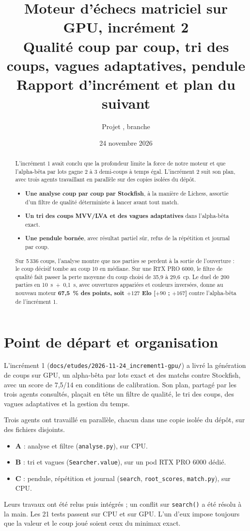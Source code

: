 \documentclass[11pt,a4paper]{article}
\title{Moteur d'échecs matriciel sur GPU, incrément 2\\[2pt]
\large Qualité coup par coup, tri des coups, vagues adaptatives, pendule\\
\normalsize Rapport d'incrément et plan du suivant}
\author{Projet \code{chess-gpu}, branche \code{claude/zen-pasteur-vjg9yx}}
\date{24 novembre 2026}
\newcommand{\code}[1]{\texttt{#1}}
\begin{document}
\maketitle

\begin{abstract}
L'incrément 1 avait conclu que la profondeur limite la force de notre moteur et que l'alpha-bêta
par lots gagne 2 à 3 demi-coups à temps égal. L'incrément 2 suit son plan, avec trois agents
travaillant en parallèle sur des copies isolées du dépôt.
\begin{itemize}
\item \textbf{Une analyse coup par coup par Stockfish}, à la manière de Lichess, assortie d'un
filtre de qualité déterministe à lancer avant tout match.
\item \textbf{Un tri des coups MVV/LVA et des vagues adaptatives} dans l'alpha-bêta exact.
\item \textbf{Une pendule bornée}, avec résultat partiel sûr, refus de la répétition et journal par
coup.
\end{itemize}
Sur 5\,336 coups, l'analyse montre que nos parties se perdent à la sortie de l'ouverture : le coup
décisif tombe au coup 10 en médiane. Sur une RTX PRO 6000, le filtre de qualité fait passer la
perte moyenne du coup choisi de 35{,}9 à 29{,}6~cp. Le duel de 200 parties en 10~s~+~0{,}1~s, avec
ouvertures appariées et couleurs inversées, donne au nouveau moteur \textbf{67{,}5~\% des points,
soit $+127$ Elo [$+90$ ; $+167$]} contre l'alpha-bêta de l'incrément 1.
\end{abstract}

\tableofcontents

\section{Point de départ et organisation}
L'incrément 1 (\code{docs/etudes/2026-11-24\_increment1-gpu/}) a livré la génération de coups sur
GPU, un alpha-bêta par lots exact et des matchs contre Stockfish, avec un score de 7{,}5/14 en
conditions de calibration. Son plan, partagé par les trois agents consultés, plaçait en tête un
filtre de qualité, le tri des coups, des vagues adaptatives et la gestion du temps.

Trois agents ont travaillé en parallèle, chacun dans une copie isolée du dépôt, sur des fichiers
disjoints.
\begin{itemize}
\item \textbf{A} : analyse et filtre (\code{analyse.py}), sur CPU.
\item \textbf{B} : tri et vagues (\code{Searcher.value}), sur un pod RTX PRO 6000 dédié.
\item \textbf{C} : pendule, répétition et journal (\code{search}, \code{root\_scores},
\code{match.py}), sur CPU.
\end{itemize}
Leurs travaux ont été relus puis intégrés ; un conflit sur \code{search()} a été résolu à la main.
Les 21 tests passent sur CPU et sur GPU. L'un d'eux impose toujours que la valeur et le coup joué
soient ceux du minimax exact.
\end{document}
